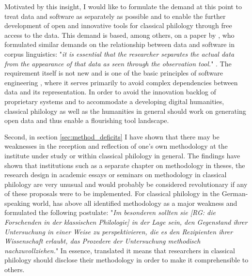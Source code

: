 \documentclass[12pt, a4paper, titlepage, oneside, abstract=true, toc=listof, toc=bibliography, BCOR=1cm]{scrreprt}
\begin{document}
{Motivated by this insight, I would like to formulate the demand at this point to treat data and software as separately as possible and to enable the further development of open and innovative tools for classical philology through free access to the data. This demand is based, among others, on a paper by \citet{Anthony2013}, who formulated similar demands on the relationship between data and software in corpus linguistics: "\textit{it is essential that the researcher separates the actual data from the appearance of that data as seen through the observation tool.}" \citep[p. 143]{Anthony2013}. The requirement itself is not new and is one of the basic principles of software engineering \citep{Sommerville2007}, where it serves primarily to avoid complex dependencies between data and its representation. In order to avoid the innovation backlog of proprietary systems and to accommodate a developing digital humanities, classical philology as well as the humanities in general should work on generating open data and thus enable a flourishing tool landscape.

Second, in section \ref{sec:method_deficits} I have shown that there may be weaknesses in the reception and reflection of one's own methodology at the institute under study or within classical philology in general. The findings have shown that institutions such as a separate chapter on methodology in theses, the research design in academic essays or seminars on methodology in classical philology are very unusual and would probably be considered revolutionary if any of these proposals were to be implemented. For classical philology in the German-speaking world, \citet[p. 247]{Schwindt2011} has above all identified methodology as a major weakness and formulated the following postulate: "\textit{Im besonderen sollten sie [RG: die Forschenden in der klassischen Philologie] in der Lage sein, den Gegenstand ihrer Untersuchung in einer Weise zu perspektivieren, die es den Rezipienten ihrer Wissenschaft erlaubt, das Prozedere der Untersuchung methodisch nachzuvollziehen.}" In essence, translated it means that researchers in classical philology should disclose their methodology in order to make it comprehensible to others. 

}
\end{document}
